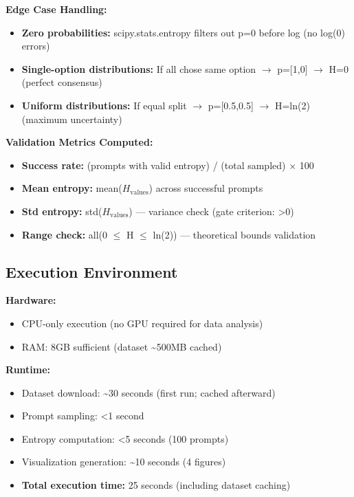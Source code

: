 \textbf{Edge Case Handling:}
\begin{itemize}
\item \textbf{Zero probabilities:} scipy.stats.entropy filters out p=0 before log (no log(0) errors)
\item \textbf{Single-option distributions:} If all chose same option $\rightarrow$ p=[1,0] $\rightarrow$ H=0 (perfect consensus)
\item \textbf{Uniform distributions:} If equal split $\rightarrow$ p=[0.5,0.5] $\rightarrow$ H=ln(2) (maximum uncertainty)
\end{itemize}

\textbf{Validation Metrics Computed:}
\begin{itemize}
\item \textbf{Success rate:} (prompts with valid entropy) / (total sampled) $\times$ 100
\item \textbf{Mean entropy:} mean($H_{\text{values}}$) across successful prompts
\item \textbf{Std entropy:} std($H_{\text{values}}$) — variance check (gate criterion: >0)
\item \textbf{Range check:} all(0 $\leq$ H $\leq$ ln(2)) — theoretical bounds validation
\end{itemize}

\subsection{Execution Environment}

\textbf{Hardware:}
\begin{itemize}
\item CPU-only execution (no GPU required for data analysis)
\item RAM: 8GB sufficient (dataset \textasciitilde{}500MB cached)
\end{itemize}

\textbf{Runtime:}
\begin{itemize}
\item Dataset download: \textasciitilde{}30 seconds (first run; cached afterward)
\item Prompt sampling: <1 second
\item Entropy computation: <5 seconds (100 prompts)
\item Visualization generation: \textasciitilde{}10 seconds (4 figures)
\item \textbf{Total execution time:} 25 seconds (including dataset caching)
\end{itemize}

